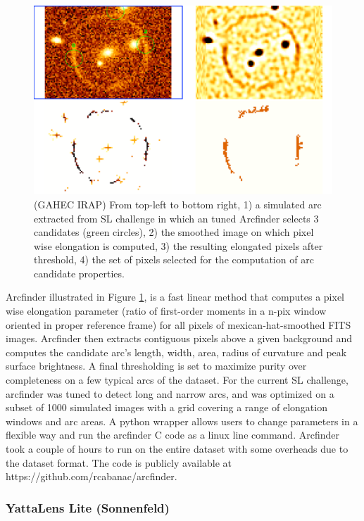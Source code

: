 \documentclass[useAMS,usenatbib]{mnras}
\begin{document}
\begin{figure}
 \includegraphics[width=\columnwidth]{figures/arcmethod.pdf}
 \caption{ (GAHEC IRAP) From top-left to bottom right, 1) a simulated arc extracted from SL challenge in which an tuned Arcfinder selects 3 candidates (green circles), 2) the smoothed image on which pixel wise elongation is computed, 3) the resulting elongated pixels after threshold, 4) the set of pixels selected for the computation of arc candidate properties. }
 \label{fig:Cabanac}
\end{figure}

Arcfinder \citep{2006astro.ph..6757A,2007A&A...461..813C,2012ApJ...749...38M} illustrated in Figure \ref{fig:Cabanac}, is a fast linear method that computes a pixel wise elongation parameter (ratio of first-order moments in a n-pix window oriented in proper reference frame) for all pixels of mexican-hat-smoothed FITS images. Arcfinder then extracts contiguous pixels above a given background and computes the candidate arc's length, width, area, radius of curvature and peak surface brightness. A final thresholding is set to maximize purity over completeness on a few typical arcs of the dataset.
For the current SL challenge, arcfinder was tuned to detect long and narrow arcs, and was optimized on a subset of 1000 simulated images with a grid covering a range of elongation windows and arc areas.  A python wrapper allows users to change parameters in a flexible way and run the arcfinder C code as a linux line command. Arcfinder took a couple of hours to run on the entire dataset with some overheads due to the dataset format. The code is publicly available at https://github.com/rcabanac/arcfinder.

\subsubsection{YattaLens Lite (Sonnenfeld)}
\end{document}
